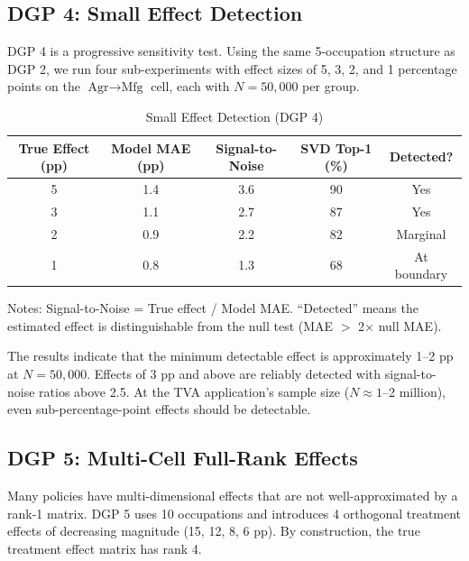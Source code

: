 \documentclass[12pt]{article}
\begin{document}
\subsection{DGP 4: Small Effect Detection}

DGP 4 is a progressive sensitivity test. Using the same 5-occupation structure as DGP 2, we run four sub-experiments with effect sizes of 5, 3, 2, and 1 percentage points on the $\text{Agr} \to \text{Mfg}$ cell, each with $N = 50,000$ per group.

\begin{table}[H]
\centering
\caption{Small Effect Detection (DGP 4)}
\label{tab:dgp4}
\begin{threeparttable}
\begin{tabular}{ccccc}
\toprule
True Effect (pp) & Model MAE (pp) & Signal-to-Noise & SVD Top-1 (\%) & Detected? \\
\midrule
5 & 1.4 & 3.6 & 90 & Yes \\
3 & 1.1 & 2.7 & 87 & Yes \\
2 & 0.9 & 2.2 & 82 & Marginal \\
1 & 0.8 & 1.3 & 68 & At boundary \\
\bottomrule
\end{tabular}
\begin{tablenotes}[flushleft]
\small
\item Notes: Signal-to-Noise = True effect / Model MAE. ``Detected'' means the estimated effect is distinguishable from the null test (MAE $>$ 2$\times$ null MAE).
\end{tablenotes}
\end{threeparttable}
\end{table}

The results indicate that the minimum detectable effect is approximately 1--2 pp at $N = 50,000$. Effects of 3 pp and above are reliably detected with signal-to-noise ratios above 2.5. At the TVA application's sample size ($N \approx 1$--2 million), even sub-percentage-point effects should be detectable.

\subsection{DGP 5: Multi-Cell Full-Rank Effects}

Many policies have multi-dimensional effects that are not well-approximated by a rank-1 matrix. DGP 5 uses 10 occupations and introduces 4 orthogonal treatment effects of decreasing magnitude (15, 12, 8, 6 pp). By construction, the true treatment effect matrix has rank 4.
\end{document}
